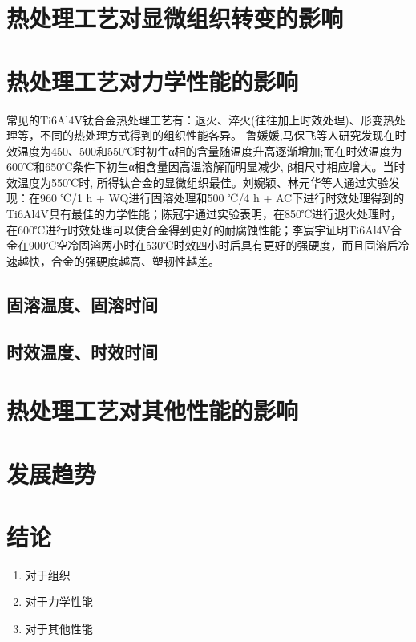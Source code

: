 \documentclass[
class = book,
zihao = -4,
font = noto,
paper = a4paper,
openany
]{easybook}
\newcommand{\ti}{Ti6Al4V}
\begin{document}
\chapter{热处理工艺对显微组织转变的影响}
\chapter{热处理工艺对力学性能的影响}
	常见的\ti 钛合金热处理工艺有：退火、淬火(往往加上时效处理)、形变热处理等，不同的热处理方式得到的组织性能各异。 鲁媛媛,马保飞等人研究发现在时效温度为450、500和550℃时初生α相的含量随温度升高逐渐增加;而在时效温度为600℃和650℃条件下初生α相含量因高温溶解而明显减少, β相尺寸相应增大。当时效温度为550℃时, 所得钛合金的显微组织最佳\cite{timing}。刘婉颖、林元华等人通过实验发现：在960 ℃/1 h + WQ进行固溶处理和500 ℃/4 h + AC下进行时效处理得到的\ti 具有最佳的力学性能\cite{960500}；陈冠宇通过实验表明，在850℃进行退火处理时，在600℃进行时效处理可以使合金得到更好的耐腐蚀性能\cite{1200}；李宸宇证明\ti 合金在900℃空冷固溶两小时在530℃时效四小时后具有更好的强硬度，而且固溶后冷速越快，合金的强硬度越高、塑韧性越差\cite{900}。%
	\section{固溶温度、固溶时间}
	\section{时效温度、时效时间}
	\chapter{热处理工艺对其他性能的影响}

	\chapter{发展趋势}
	\chapter{结论}
	\begin{enumerate}
		\item 对于组织
		\item 对于力学性能
		\item 对于其他性能
	\end{enumerate}


	\backmatter
	\listoffigures
	\listoftables
	\clearpage
	
\end{document}
